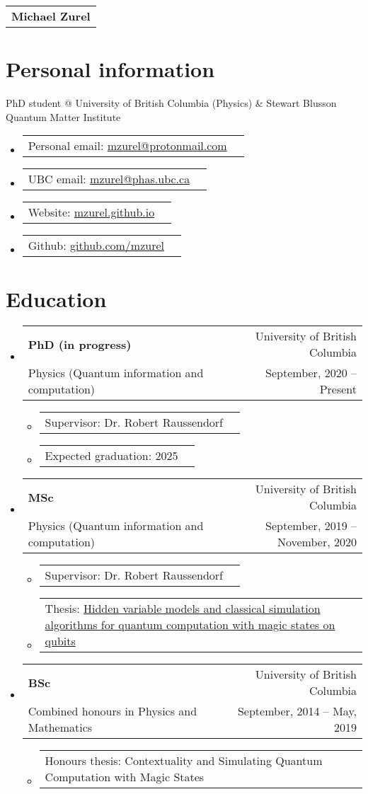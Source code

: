\documentclass[letterpaper,11pt]{article}
\makeatletter
\newcommand{\PersonalInfoItem}[2]{
	\item{\vspace{-1pt}
		\begin{tabular*}{0.92\textwidth}{l@{\extracolsep{\fill}}r}
			{#1} & {#2}
		\end{tabular*}
		\vspace{-5pt}
	}
}
\newcommand{\EducationItem}[4]{
	\item{\vspace{-1pt}
		\begin{tabular*}{0.97\textwidth}{l@{\extracolsep{\fill}}r}
			\textbf{#1} & {#2}\\
			{#3} & {#4}
		\end{tabular*}
		\vspace{-5pt}
	}
}
\newcommand{\EducationSubItem}[2]{
	\item{\vspace{-1pt}
		\begin{tabular*}{0.92\textwidth}{l@{\extracolsep{\fill}}r}
			{\footnotesize #1} & {\footnotesize #2}
		\end{tabular*}
		\vspace{-5pt}
	}
}
\makeatother
\begin{document}
\begin{tabular*}{\textwidth}{l@{\extracolsep{\fill}}}
	{\Huge \textbf{Michael Zurel}}%
\end{tabular*}

\section*{Personal information}
PhD student @ University of British Columbia (Physics) \& Stewart Blusson Quantum Matter Institute
\begin{itemize}[leftmargin=*]
	\PersonalInfoItem{Personal email: \href{mailto:mzurel@protonmail.com}{mzurel@protonmail.com}}{}
	\PersonalInfoItem{UBC email: \href{mailto:mzurel@phas.ubc.ca}{mzurel@phas.ubc.ca}}{}
	\PersonalInfoItem{Website: \href{https://mzurel.github.io}{mzurel.github.io}}{}
	\PersonalInfoItem{Github: \href{https://github.com/mzurel}{github.com/mzurel}}{}
\end{itemize}

\section*{Education}
\begin{itemize}[leftmargin=*]
	\EducationItem{PhD (in progress)}{University of British Columbia}{Physics (Quantum information and computation)}{September, 2020 -- Present}
	\begin{itemize}
		\vspace{-3pt}
		\EducationSubItem{Supervisor: Dr. Robert Raussendorf}{}
		\EducationSubItem{Expected graduation: 2025}{}
	\end{itemize}
	
	\EducationItem{MSc}{University of British Columbia}{Physics (Quantum information and computation)}{September, 2019 -- November, 2020}
	\begin{itemize}
		\vspace{-3pt}
		\EducationSubItem{Supervisor: Dr. Robert Raussendorf}{}
		\EducationSubItem{Thesis: \href{https://dx.doi.org/10.14288/1.0394790}{Hidden variable models and classical simulation algorithms for quantum computation with magic states on qubits}}{}
	\end{itemize}
	
	\EducationItem{BSc}{University of British Columbia}{Combined honours in Physics and Mathematics}{September, 2014 -- May, 2019}
	\begin{itemize}
		\vspace{-3pt}
		\EducationSubItem{Honours thesis: Contextuality and Simulating Quantum Computation with Magic States}{}
	\end{itemize}
\end{itemize}
\end{document}
